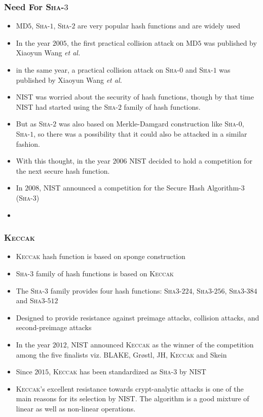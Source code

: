 \documentclass{beamer}
\newcommand{\KECCAK}{\mbox{\textsc{Keccak}}}
\newcommand{\Keccak}{\mbox{\textsc{Keccak}}}
\newcommand{\SHA}{\textsc{Sha}}
\newcommand{\etal}{\textit{et al. }}
\begin{document}
\begin{frame}
	\frametitle{Need For \SHA-$3$}
	\begin{itemize}
		\item MD$5$, \SHA-$1$, \SHA-$2$ are very popular hash functions and are widely used
		\item In the year $2005$, the first practical collision attack on MD$5$ was published by Xiaoyun Wang \etal
		\item in the same year, a practical collision attack on \SHA-$0$ and \SHA-$1$ was published by Xiaoyun Wang \etal
		\item NIST was worried about the security of hash functions, though by that time NIST had started using the \SHA-$2$ family of hash functions.
		\item But as \SHA-$2$ was also based on Merkle-Damgard construction like \SHA-$0$, \SHA-$1$, so there was a possibility that it could also be attacked in a similar fashion.
		\item With this thought, in the year $2006$ NIST decided to hold a competition for the next secure hash function.
		\item In $2008$, NIST announced a competition for the Secure Hash Algorithm-$3$ (\SHA-$3$)
		\item 
	\end{itemize}
\end{frame}

\begin{frame}
	\frametitle{\KECCAK{}}
	\begin{itemize}
		\item \KECCAK{} hash function is based on sponge construction
		\item \SHA-$3$ family of hash functions is based on \Keccak{}
		\item The \SHA-$3$ family provides four hash functions: \SHA3-$224$, \SHA3-$256$, \SHA3-$384$ and \SHA3-$512$
		\item Designed to provide resistance against preimage attacks, collision attacks, and second-preimage attacks
		\item  In the year $2012$, NIST announced \KECCAK{} as the winner of the competition among the five finalists viz. BLAKE, Gr\o stl, JH, \KECCAK{} and Skein
		\item Since $2015$, \KECCAK{} has been standardized as \SHA-$3$ by NIST
		\item \Keccak{}'s excellent resistance towards crypt-analytic attacks is one of the main reasons for its selection by NIST. The algorithm is a good mixture of linear as well as non-linear operations.
	\end{itemize}
\end{frame}
\end{document}
